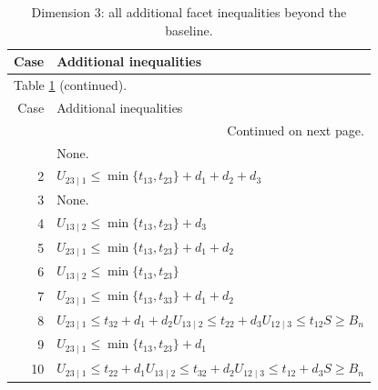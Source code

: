 \documentclass[a4paper,11pt]{amsart}
\numberwithin{equation}{section}
\theoremstyle{definition}
\theoremstyle{remark}
\begin{document}
{\small\setlength{\tabcolsep}{4.5pt}
\begin{longtable}{@{}r>{\raggedright\arraybackslash}p{12.9cm}@{}}
\caption{Dimension $ 3$: all additional facet inequalities beyond the baseline.}\label{tab:extras-n3}\\
\toprule
Case & Additional inequalities\\
\midrule\endfirsthead
\multicolumn{2}{l}{\small Table \ref{tab:extras-n3} (continued).}\\
\toprule
Case & Additional inequalities\\
\midrule\endhead
\midrule
\multicolumn{2}{r}{\small Continued on next page.}\\
\endfoot\bottomrule\endlastfoot
1 & None.\\[3pt]
2 & \(U_{23\mid 1}\leq \min\{t_{13},t_{23}\}+d_{1}+d_{2}+d_{3}\)\\[3pt]
3 & None.\\[3pt]
4 & \(U_{13\mid 2}\leq \min\{t_{13},t_{23}\}+d_{3}\)\\[3pt]
5 & \(U_{23\mid 1}\leq \min\{t_{13},t_{23}\}+d_{1}+d_{2}\)\\[3pt]
6 & \(U_{13\mid 2}\leq \min\{t_{13},t_{23}\}\)\\[3pt]
7 & \(U_{23\mid 1}\leq \min\{t_{13},t_{33}\}+d_{1}+d_{2}\)\\[3pt]
8 & \(U_{23\mid 1}\leq t_{32}+d_{1}+d_{2}\)\newline \(U_{13\mid 2}\leq t_{22}+d_{3}\)\newline \(U_{12\mid 3}\leq t_{12}\)\newline \(S\geq B_n\)\\[3pt]
9 & \(U_{23\mid 1}\leq \min\{t_{13},t_{23}\}+d_{1}\)\\[3pt]
10 & \(U_{23\mid 1}\leq t_{22}+d_{1}\)\newline \(U_{13\mid 2}\leq t_{32}+d_{2}\)\newline \(U_{12\mid 3}\leq t_{12}+d_{3}\)\newline \(S\geq B_n\)\\[3pt]
\end{longtable}
}

\clearpage
\end{document}
